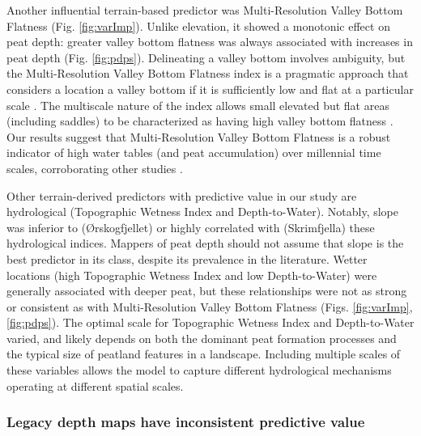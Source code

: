 \documentclass[soil, manuscript]{copernicus}
\begin{document}
Another influential terrain-based predictor was Multi-Resolution Valley Bottom Flatness (Fig. \ref{fig:varImp}).
Unlike elevation, it showed a monotonic effect on peat depth: greater valley bottom flatness was always associated with increases in peat depth (Fig. \ref{fig:pdps}).
Delineating a valley bottom involves ambiguity, but the Multi-Resolution Valley Bottom Flatness index is a pragmatic approach that considers a location a valley bottom if it is sufficiently low and flat at a particular scale \citep{gallantMultiresolutionIndexValley2003}.
The multiscale nature of the index allows small elevated but flat areas (including saddles) to be characterized as having high valley bottom flatness \citep{gallantMultiresolutionIndexValley2003}.
Our results suggest that Multi-Resolution Valley Bottom Flatness is a robust indicator of high water tables (and peat accumulation) over millennial time scales, corroborating other studies \citep{rudiyantoOpenDigitalMapping2018, deragonMappingMaximumPeat2023}.

Other terrain-derived predictors with predictive value in our study are hydrological (Topographic Wetness Index and Depth-to-Water).
Notably, slope was inferior to (Ørskogfjellet) or highly correlated with (Skrimfjella) these hydrological indices.
Mappers of peat depth should not assume that slope is the best predictor in its class, despite its prevalence in the literature.
Wetter locations (high Topographic Wetness Index and low Depth-to-Water) were generally associated with deeper peat, but these relationships were not as strong or consistent as with Multi-Resolution Valley Bottom Flatness (Figs. \ref{fig:varImp}, \ref{fig:pdps}).
The optimal scale for Topographic Wetness Index and Depth-to-Water varied, and likely depends on both the dominant peat formation processes and the typical size of peatland features in a landscape.
Including multiple scales of these variables allows the model to capture different hydrological mechanisms operating at different spatial scales.

\subsubsection{Legacy depth maps have inconsistent predictive value}
\end{document}
